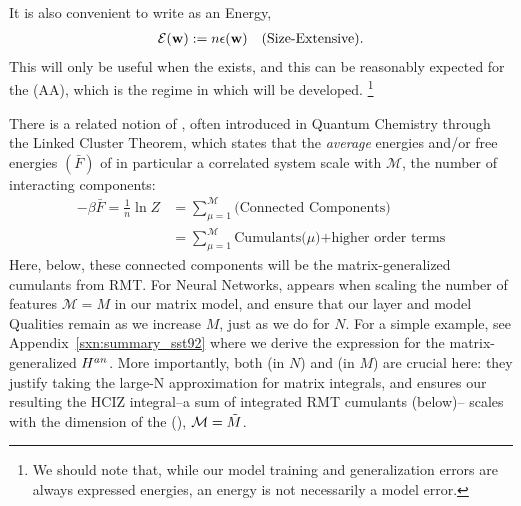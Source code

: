 
It is also convenient to write \emph{\TotalEffectivePotential} as an Energy, 
\begin{align}
 \label{eqn:detox}
 \mathcal{E}(\mathbf{w}) := n\epsilon({\mathbf{w}})\quad \text{(Size-Extensive)}.
\end{align}
This will only be useful when the \ThermodynamicLimit exists, and this
can be reasonably expected for the \AnnealedApproximation (AA),
which is the regime in which \SETOL will be developed.%
\footnote{We should note that, while our model training and generalization errors are always expressed energies, an energy is not necessarily a model error.  }

There is a related notion of \emph{\SizeConsistency},
often introduced in Quantum Chemistry through the Linked Cluster Theorem\cite{Hubbard1959,Brandow1963},
which states that the \emph{average} energies and/or free energies $(\bar{F})$ of in particular a correlated system scale with $\mathcal{M}$,
the number of interacting components:
\begin{align}
  \label{eqn:LCT}
  -\beta \bar{F}=\frac{1}{n}\ln Z &= \sum_{\mu=1}^{\mathcal{M}}\text{(Connected Components)} \\ \nonumber
  &= \sum_{\mu=1}^{\mathcal{M}}\text{Cumulants($\mu$)+higher order terms} 
\end{align}
Here, below, these connected components will be the matrix-generalized cumulants from RMT.
For Neural Networks, \SizeConsistency appears when scaling the number of features $\mathcal{M}=M$ in our matrix model,
and ensure that our layer and model Qualities  remain \SizeConsistent as we increase $M$, just as we do for $N$.
For a simple example, see Appendix~\ref{sxn:summary_sst92}
 where we derive the expression for the matrix-generalized
\AnnealedHamiltonian $H^{an}$.  
More importantly, both \SizeExtensivity (in $N$) and \SizeConsistency (in $M$)
are crucial here:  they justify taking the large-N approximation for matrix integrals, and ensures
our resulting the HCIZ integral--a sum of integrated RMT cumulants (below)--
scales with the dimension of the \EffectiveCorrelationSpace (\ECS), $\mathcal{M}=\tilde{M}$.


